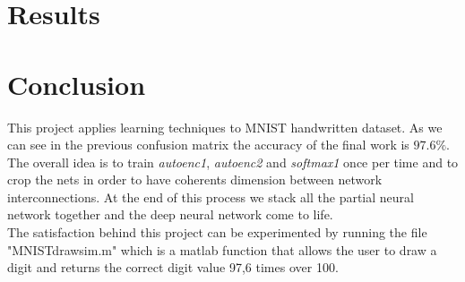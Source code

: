 \chapter{Results}

\chapter*{Conclusion}
This project applies learning \cite{art:rif.1} techniques to MNIST handwritten dataset. As we can see in the previous confusion matrix the accuracy of the final work is $97.6\%$. The overall idea is to train \emph{autoenc1},  \emph{autoenc2} and \emph{softmax1} once per time and to crop the nets in order to have coherents dimension between network interconnections. At the end of \cite{book:rif.2}this process we stack all the partial neural network together and the deep neural network come to life. \\The satisfaction behind this project can be experimented by running the file "MNIST\textunderscore drawsim.m" which is a matlab function that allows the user to draw a digit and returns the correct digit value 97,6 times over 100.